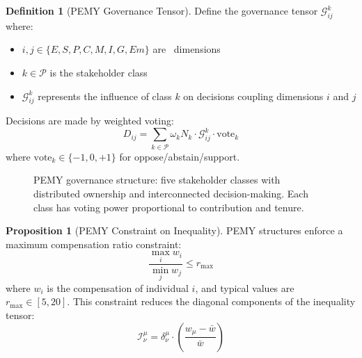 \documentclass[11pt,a4paper]{article}
\theoremstyle{definition}
\newtheorem{definition}{Definition}[section]
\newtheorem{proposition}{Proposition}[section]
\theoremstyle{remark}
\begin{document}
\begin{definition}[PEMY Governance Tensor]
Define the governance tensor $\mathcal{G}_{ij}^k$ where:
\begin{itemize}[leftmargin=1.5em]
    \item $i, j \in \{E, S, P, C, M, I, G, Em\}$ are \SESES\ dimensions
    \item $k \in \mathcal{P}$ is the stakeholder class
    \item $\mathcal{G}_{ij}^k$ represents the influence of class $k$ on decisions coupling dimensions $i$ and $j$
\end{itemize}
Decisions are made by weighted voting:
\[
D_{ij} = \sum_{k \in \mathcal{P}} \omega_k N_k \cdot \mathcal{G}_{ij}^k \cdot \text{vote}_k
\]
where $\text{vote}_k \in \{-1, 0, +1\}$ for oppose/abstain/support.
\end{definition}

\begin{figure}[H]
\centering
{}
\caption{PEMY governance structure: five stakeholder classes with distributed ownership and interconnected decision-making. Each class has voting power proportional to contribution and tenure.}
\label{fig:pemy_structure}
\end{figure}

\begin{proposition}[PEMY Constraint on Inequality]
PEMY structures enforce a maximum compensation ratio constraint:
\[
\frac{\max_{i} w_i}{\min_{j} w_j} \leq r_{\max}
\]
where $w_i$ is the compensation of individual $i$, and typical values are $r_{\max} \in [5, 20]$. This constraint reduces the diagonal components of the inequality tensor:
\[
\mathcal{I}^\mu_\nu = \delta^\mu_\nu \cdot \left( \frac{w_\mu - \bar{w}}{\bar{w}} \right)
\]
\end{proposition}
\end{document}
